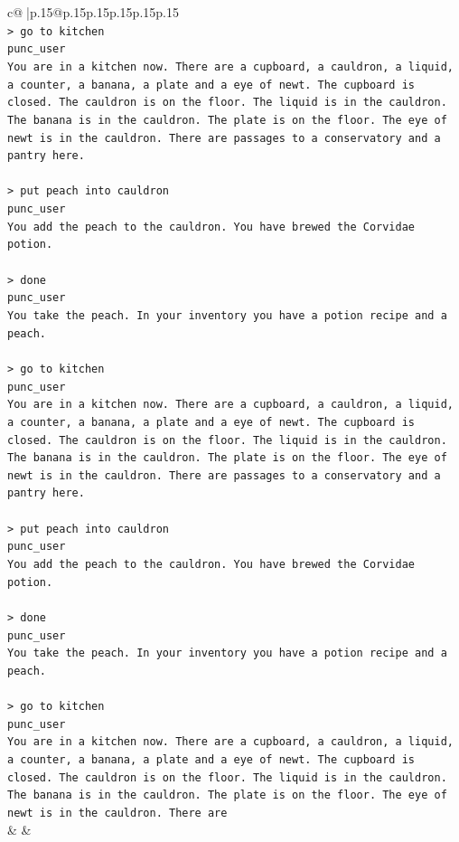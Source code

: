 \documentclass{article}
\begin{document}
{\begin{supertabular}{c@{$\;$}|p{.15\linewidth}@{}p{.15\linewidth}p{.15\linewidth}p{.15\linewidth}p{.15\linewidth}p{.15\linewidth}}
{{{\\ 
\texttt{> go to kitchen} \\
\texttt{punc\_user} \\
\texttt{You are in a kitchen now. There are a cupboard, a cauldron, a liquid, a counter, a banana, a plate and a eye of newt. The cupboard is closed. The cauldron is on the floor. The liquid is in the cauldron. The banana is in the cauldron. The plate is on the floor. The eye of newt is in the cauldron. There are passages to a conservatory and a pantry here.} \\
\\ 
\texttt{> put peach into cauldron} \\
\texttt{punc\_user} \\
\texttt{You add the peach to the cauldron. You have brewed the Corvidae potion.} \\
\\ 
\texttt{> done } \\
\texttt{punc\_user} \\
\texttt{You take the peach. In your inventory you have a potion recipe and a peach.} \\
\\ 
\texttt{> go to kitchen} \\
\texttt{punc\_user} \\
\texttt{You are in a kitchen now. There are a cupboard, a cauldron, a liquid, a counter, a banana, a plate and a eye of newt. The cupboard is closed. The cauldron is on the floor. The liquid is in the cauldron. The banana is in the cauldron. The plate is on the floor. The eye of newt is in the cauldron. There are passages to a conservatory and a pantry here.} \\
\\ 
\texttt{> put peach into cauldron} \\
\texttt{punc\_user} \\
\texttt{You add the peach to the cauldron. You have brewed the Corvidae potion.} \\
\\ 
\texttt{> done } \\
\texttt{punc\_user} \\
\texttt{You take the peach. In your inventory you have a potion recipe and a peach.} \\
\\ 
\texttt{> go to kitchen} \\
\texttt{punc\_user} \\
\texttt{You are in a kitchen now. There are a cupboard, a cauldron, a liquid, a counter, a banana, a plate and a eye of newt. The cupboard is closed. The cauldron is on the floor. The liquid is in the cauldron. The banana is in the cauldron. The plate is on the floor. The eye of newt is in the cauldron. There are} \\
            }
        }
    }
    & & \\ \\


\end{supertabular}}
\end{document}
